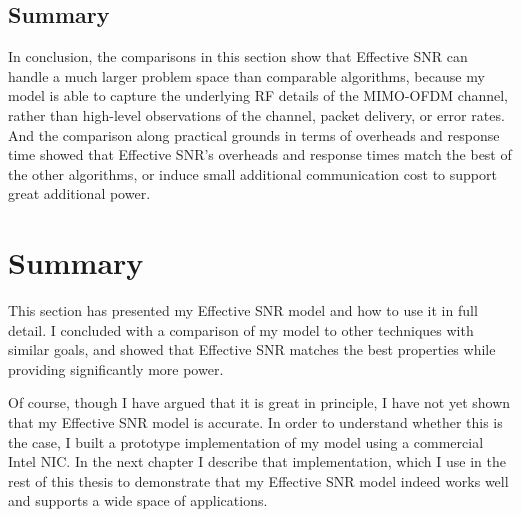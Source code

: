\subsection{Summary}
In conclusion, the comparisons in this section show that Effective SNR can handle a much larger problem space than comparable algorithms, because my model is able to capture the underlying RF details of the MIMO-OFDM channel, rather than high-level observations of the channel, packet delivery, or error rates. And the comparison along practical grounds in terms of overheads and response time showed that Effective SNR's overheads and response times match the best of the other algorithms, or induce small additional communication cost to support great additional power.

\section{Summary}
This section has presented my Effective SNR model and how to use it in full detail. I concluded with a comparison of my model to other techniques with similar goals, and showed that Effective SNR matches the best properties while providing significantly more power.

Of course, though I have argued that it is great in principle, I have not yet shown that my Effective SNR model is accurate. In order to understand whether this is the case, I built a prototype implementation of my model using a commercial Intel NIC. In the next chapter I describe that implementation, which I use in the rest of this thesis to demonstrate that my Effective SNR model indeed works well and supports a wide space of applications.


\ifx\mainfile\undefined

\fi
